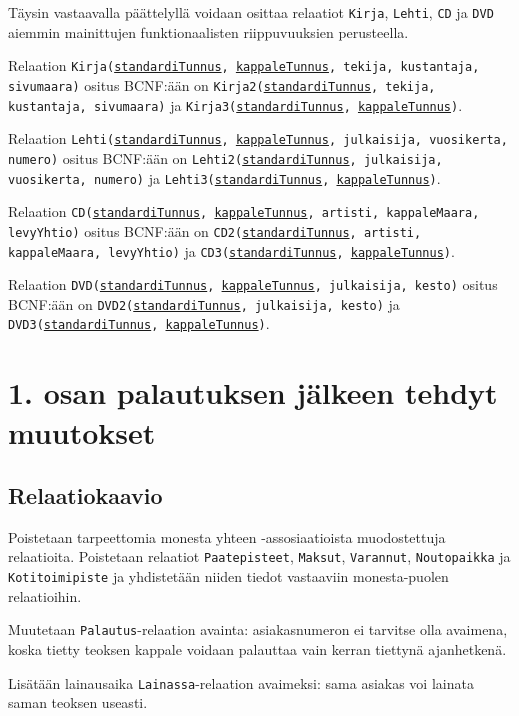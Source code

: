 \documentclass[12pt,titlepage] {article}
\begin{document}
Täysin vastaavalla päättelyllä voidaan osittaa relaatiot \texttt{Kirja}, \texttt{Lehti}, \texttt{CD} ja \texttt{DVD} aiemmin mainittujen funktionaalisten riippuvuuksien perusteella.

Relaation \texttt{Kirja(\underline{standardiTunnus}, \underline{kappaleTunnus}, tekija, kustantaja, sivumaara)} ositus BCNF:ään on \texttt{Kirja2(\underline{standardiTunnus}, tekija, kustantaja, sivumaara)} ja \texttt{Kirja3(\underline{standardiTunnus}, \underline{kappaleTunnus})}.

Relaation \texttt{Lehti(\underline{standardiTunnus}, \underline{kappaleTunnus}, julkaisija, vuosikerta, numero)} ositus BCNF:ään on \texttt{Lehti2(\underline{standardiTunnus}, julkaisija, vuosikerta, numero)} ja \texttt{Lehti3(\underline{standardiTunnus}, \underline{kappaleTunnus})}.

Relaation \texttt{CD(\underline{standardiTunnus}, \underline{kappaleTunnus}, artisti, kappaleMaara, levyYhtio)} ositus BCNF:ään on \texttt{CD2(\underline{standardiTunnus}, artisti, kappaleMaara, levyYhtio)} ja \texttt{CD3(\underline{standardiTunnus}, \underline{kappaleTunnus})}.

Relaation \texttt{DVD(\underline{standardiTunnus}, \underline{kappaleTunnus}, julkaisija, kesto)} ositus BCNF:ään on \texttt{DVD2(\underline{standardiTunnus}, julkaisija, kesto)} ja \texttt{DVD3(\underline{standardiTunnus}, \underline{kappaleTunnus})}.

\section {1. osan palautuksen jälkeen tehdyt muutokset}

\subsection {Relaatiokaavio}

Poistetaan tarpeettomia monesta yhteen -assosiaatioista muodostettuja relaatioita. Poistetaan relaatiot \texttt{Paatepisteet}, \texttt{Maksut}, \texttt{Varannut}, \texttt{Noutopaikka} ja \texttt{Kotitoimipiste} ja yhdistetään niiden tiedot vastaaviin monesta-puolen relaatioihin.

Muutetaan \texttt{Palautus}-relaation avainta: asiakasnumeron ei tarvitse olla avaimena, koska tietty teoksen kappale voidaan palauttaa vain kerran tiettynä ajanhetkenä.

Lisätään lainausaika \texttt{Lainassa}-relaation avaimeksi: sama asiakas voi lainata saman teoksen useasti.
\end{document}
